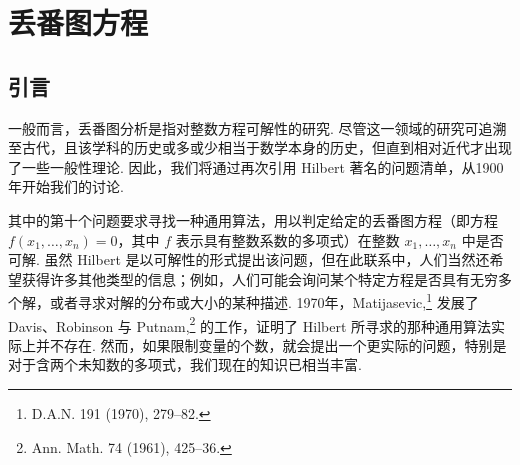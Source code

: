 
\chapter{丢番图方程}\label{ch:4}

\section{引言}\label{sec:ch4_1}

一般而言，丢番图分析是指对整数方程可解性的研究. 尽管这一领域的研究可追溯至古代，且该学科的历史或多或少相当于数学本身的历史，但直到相对近代才出现了一些一般性理论. 因此，我们将通过再次引用 Hilbert 著名的问题清单，从1900年开始我们的讨论.

其中的第十个问题要求寻找一种通用算法，用以判定给定的丢番图方程（即方程 $f(x_1, \dots, x_n) = 0$，其中 $f$ 表示具有整数系数的多项式）在整数 $x_1, \dots, x_n$ 中是否可解. 虽然 Hilbert 是以可解性的形式提出该问题，但在此联系中，人们当然还希望获得许多其他类型的信息；例如，人们可能会询问某个特定方程是否具有无穷多个解，或者寻求对解的分布或大小的某种描述. 1970年，Matijasevic,\footnote{D.A.N. 191 (1970), 279--82.} 发展了 Davis、Robinson 与 Putnam,\footnote{Ann. Math. 74 (1961), 425--36.} 的工作，证明了 Hilbert 所寻求的那种通用算法实际上并不存在. 然而，如果限制变量的个数，就会提出一个更实际的问题，特别是对于含两个未知数的多项式，我们现在的知识已相当丰富.

